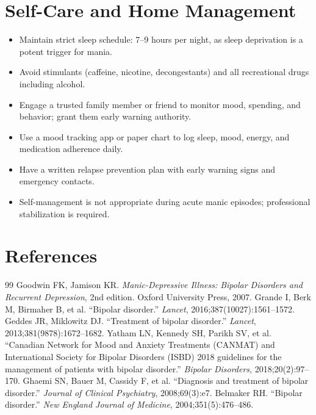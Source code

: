 \section*{Self-Care and Home Management}
\begin{itemize}
  \item Maintain strict sleep schedule: 7--9 hours per night, as sleep deprivation is a potent trigger for mania.
  \item Avoid stimulants (caffeine, nicotine, decongestants) and all recreational drugs including alcohol.
  \item Engage a trusted family member or friend to monitor mood, spending, and behavior; grant them early warning authority.
  \item Use a mood tracking app or paper chart to log sleep, mood, energy, and medication adherence daily.
  \item Have a written relapse prevention plan with early warning signs and emergency contacts.
  \item Self-management is not appropriate during acute manic episodes; professional stabilization is required.
\end{itemize}

\section*{References}
\begin{thebibliography}{99}
 Goodwin FK, Jamison KR. \textit{Manic-Depressive Illness: Bipolar Disorders and Recurrent Depression}, 2nd edition. Oxford University Press, 2007.
 Grande I, Berk M, Birmaher B, et al. ``Bipolar disorder.'' \textit{Lancet}, 2016;387(10027):1561--1572.
 Geddes JR, Miklowitz DJ. ``Treatment of bipolar disorder.'' \textit{Lancet}, 2013;381(9878):1672--1682.
 Yatham LN, Kennedy SH, Parikh SV, et al. ``Canadian Network for Mood and Anxiety Treatments (CANMAT) and International Society for Bipolar Disorders (ISBD) 2018 guidelines for the management of patients with bipolar disorder.'' \textit{Bipolar Disorders}, 2018;20(2):97--170.
 Ghaemi SN, Bauer M, Cassidy F, et al. ``Diagnosis and treatment of bipolar disorder.'' \textit{Journal of Clinical Psychiatry}, 2008;69(3):e7.
 Belmaker RH. ``Bipolar disorder.'' \textit{New England Journal of Medicine}, 2004;351(5):476--486.

\end{thebibliography}
